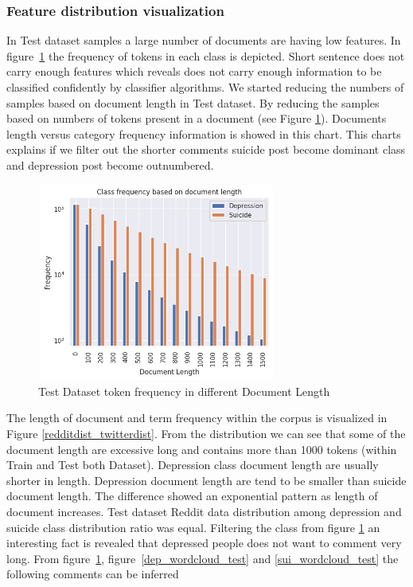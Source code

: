 \documentclass[sn-mathphys,Numbered]{sn-jnl}%
\theoremstyle{thmstyleone}%
\theoremstyle{thmstyletwo}%
\theoremstyle{thmstylethree}%
\begin{document}
\subsubsection{Feature distribution visualization}
In Test dataset samples a large number of documents are having low features. In figure~\ref{fig_Test_Dataset_token_frequency} the frequency of tokens in each class is depicted. Short sentence does not carry enough features which reveals does not carry enough information to be classified confidently by classifier algorithms. We started reducing the numbers of samples based on document length in Test dataset. By reducing the samples based on numbers of tokens present in a document (see Figure \ref{fig_Test_Dataset_token_frequency}). Documents length versus category frequency information is showed in this chart. This charts explains if we filter out the shorter comments suicide post become dominant class and depression post become outnumbered. 
%
\begin{figure}[H]
\centering
\includegraphics[height=6.5cm, width=0.7\textwidth]{doc_len.png}
\caption{Test Dataset token frequency in different Document Length}
\label{fig_Test_Dataset_token_frequency}
\end{figure}
%
The length of document and term frequency within the corpus is visualized in Figure \ref{redditdist_twitterdist}. From the distribution we can see that some of the document length are excessive long and contains more than 1000 tokens (within Train and Test both Dataset). Depression class document length are usually shorter in length. Depression document length are tend to be smaller than suicide document length. The difference showed an exponential pattern as length of document increases. Test dataset Reddit data distribution among depression and suicide class distribution ratio was equal. Filtering the class from figure \ref{fig_Test_Dataset_token_frequency} an interesting fact is revealed that depressed people does not want to comment very long. From figure~\ref{fig_Test_Dataset_token_frequency},  figure~\ref{dep_wordcloud_test} and \ref{sui_wordcloud_test} the following comments can be inferred
\end{document}
